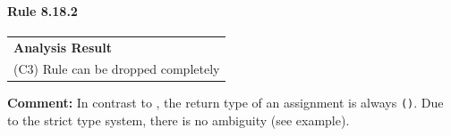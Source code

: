 \paragraph{Rule 8.18.2}
\begin{longtable}{p{13cm}}
\textbf{Analysis Result} \\
(C3) Rule can be dropped completely \\
\end{longtable}
\textbf{Comment:} In contrast to \Cpp, the return type of an assignment is always \texttt{()}. Due to the strict type system, there is no ambiguity (see example). \\


